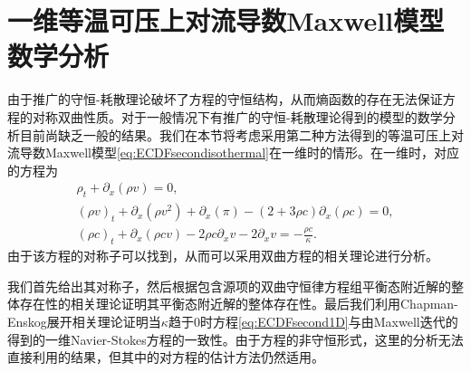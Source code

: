 
\section{一维等温可压上对流导数Maxwell模型数学分析}
由于推广的守恒-耗散理论破坏了方程的守恒结构，从而熵函数的存在无法保证方程的对称双曲性质。对于一般情况下有推广的守恒-耗散理论得到的模型的数学分析目前尚缺乏一般的结果。我们在本节将考虑采用第二种方法得到的等温可压上对流导数Maxwell模型\eqref{eq:ECDFsecondisothermal}在一维时的情形。在一维时，对应的方程为
\begin{subequations} \label{eq:ECDFsecond1D}
		\begin{align}
			\rho_t + \partial_x (\rho v) = 0 ,\\
			(\rho v)_t + \partial_x (\rho v^2) + \partial_x (\pi)   -  (2+ 3 \rho c) \partial_x (  \rho c) =0 ,\\
			(\rho c)_t +  \partial_x (\rho c  v) - 2 \rho c \partial_x  v  - 2 \partial_x v = - \frac{\rho {c}}{\kappa}  .
		\end{align}
\end{subequations}
由于该方程的对称子可以找到，从而可以采用双曲方程的相关理论进行分析。

我们首先给出其对称子，然后根据包含源项的双曲守恒律方程组平衡态附近解的整体存在性的相关理论\cite{yong2004entropy,kawashima2009decay}证明其平衡态附近解的整体存在性。最后我们利用Chapman-Enskog展开相关理论\cite{yang2015validity}证明当$\kappa$趋于$0$时方程\eqref{eq:ECDFsecond1D}与由Maxwell迭代的得到的一维Navier-Stokes方程的一致性。由于方程的非守恒形式，这里的分析无法直接利用\cite{yong2004entropy,yang2015validity}的结果，但其中的对方程的估计方法仍然适用。



